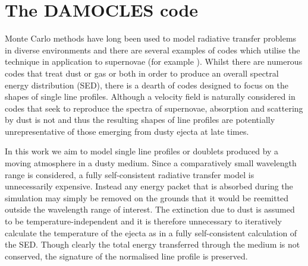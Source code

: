 \documentclass[useAMS,usenatbib,usegraphicx]{mnras}
\begin{document}




\section{The DAMOCLES code}
\label{code}

Monte Carlo methods have long been used to model radiative transfer 
problems in diverse environments and there are several examples of codes 
which utilise the technique in application to supernovae 
(for example \citet{Maeda2003, Lucy2005c, Jerkstrand2012,Owen2015}).  Whilst there are numerous codes that 
treat dust or gas or both in order to produce an overall spectral energy 
distribution (SED), there is a dearth of codes designed to focus on the 
shapes of single line profiles.  Although a velocity field is naturally 
considered in codes that seek to reproduce the spectra of supernovae, 
absorption and scattering by dust is not and thus the resulting shapes of 
line profiles are potentially unrepresentative of those emerging from 
dusty ejecta at late times.

In this work we aim to model single line profiles or doublets produced by 
a moving atmosphere in a dusty medium.  
Since a comparatively small wavelength range is considered, a fully 
self-consistent radiative transfer model is unnecessarily expensive.  
Instead any energy packet that is absorbed during the simulation may 
simply be removed on the grounds that it would be 
reemitted outside the wavelength range of interest. The extinction due to 
dust is assumed to be temperature-independent and it is therefore 
unnecessary to iteratively calculate the temperature of the ejecta as in a 
fully self-consistent calculation of the SED.  Though clearly the total 
energy transferred through the medium is not conserved, the signature of 
the normalised line profile is preserved.
\end{document}
